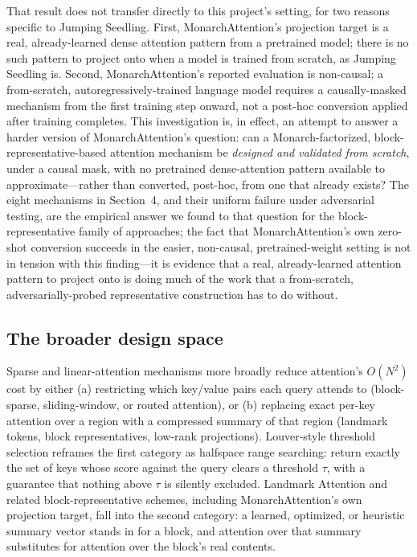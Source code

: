 \documentclass[11pt]{article}
\begin{document}
That result does not transfer directly to this project's setting, for two reasons specific
to Jumping Seedling. First, MonarchAttention's projection target is a real, already-learned
dense attention pattern from a pretrained model; there is no such pattern to project onto
when a model is trained from scratch, as Jumping Seedling is. Second, MonarchAttention's
reported evaluation is non-causal; a from-scratch, autoregressively-trained language model
requires a causally-masked mechanism from the first training step onward, not a post-hoc
conversion applied after training completes. This investigation is, in effect, an attempt
to answer a harder version of MonarchAttention's question: can a Monarch-factorized,
block-representative-based attention mechanism be \emph{designed and validated from
scratch}, under a causal mask, with no pretrained dense-attention pattern available to
approximate---rather than converted, post-hoc, from one that already exists? The eight
mechanisms in Section~4, and their uniform failure under adversarial testing, are the
empirical answer we found to that question for the block-representative family of
approaches; the fact that MonarchAttention's own zero-shot conversion succeeds in the
easier, non-causal, pretrained-weight setting is not in tension with this finding---it
is evidence that a real, already-learned attention pattern to project onto is doing much of
the work that a from-scratch, adversarially-probed representative construction has to do
without.

\subsection{The broader design space}

Sparse and linear-attention mechanisms more broadly reduce attention's $O(N^2)$ cost by
either (a) restricting which key/value pairs each query attends to (block-sparse,
sliding-window, or routed attention), or (b) replacing exact per-key attention over a
region with a compressed summary of that region (landmark tokens, block representatives,
low-rank projections). Louver-style threshold selection \cite{louver} reframes the first
category as halfspace range searching: return exactly the set of keys whose score against
the query clears a threshold $\tau$, with a guarantee that nothing above $\tau$ is silently
excluded. Landmark Attention \cite{landmark} and related block-representative schemes,
including MonarchAttention's own projection target, fall into the second category: a
learned, optimized, or heuristic summary vector stands in for a block, and attention over
that summary substitutes for attention over the block's real contents.
\end{document}
